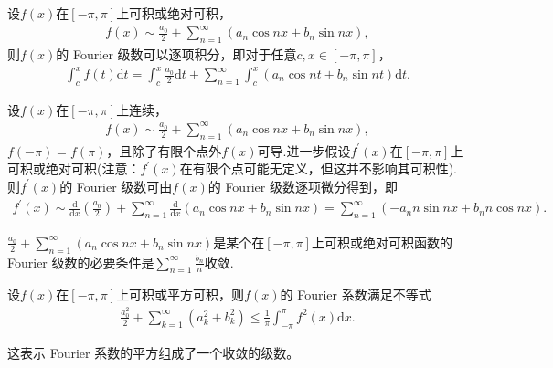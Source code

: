 \documentclass[../../main.tex]{subfiles}
\begin{document}
\begin{theorem}[Fourier级数的逐项积分定理]\label{theorem:Fourier级数的逐项积分定理}
设$f(x)$在$[-\pi,\pi]$上可积或绝对可积，
\begin{align*}
f(x)\sim\frac{a_0}{2}+\sum_{n = 1}^{\infty}(a_n\cos nx + b_n\sin nx),
\end{align*}
则$f(x)$的 Fourier 级数可以逐项积分，即对于任意$c,x\in[-\pi,\pi]$，
\begin{align*}
\int_{c}^{x}f(t)\mathrm{d}t=\int_{c}^{x}\frac{a_0}{2}\mathrm{d}t+\sum_{n = 1}^{\infty}\int_{c}^{x}(a_n\cos nt + b_n\sin nt)\mathrm{d}t.
\end{align*}
\end{theorem}

\begin{theorem}[Fourier级数的逐项微分定理]\label{theorem:Fourier级数的逐项微分定理}
设$f(x)$在$[-\pi,\pi]$上连续，
\begin{align*}
f(x)\sim\frac{a_0}{2}+\sum_{n = 1}^{\infty}(a_n\cos nx + b_n\sin nx),
\end{align*}
$f(-\pi)=f(\pi)$，且除了有限个点外$f(x)$可导.进一步假设$f^{\prime}(x)$在$[-\pi,\pi]$上可积或绝对可积(注意：$f^{\prime}(x)$在有限个点可能无定义，但这并不影响其可积性). 则$f^{\prime}(x)$的 Fourier 级数可由$f(x)$的 Fourier 级数逐项微分得到，即
\begin{align*}
f^{\prime}(x)\sim\frac{\mathrm{d}}{\mathrm{d}x}\left(\frac{a_0}{2}\right)+\sum_{n = 1}^{\infty}\frac{\mathrm{d}}{\mathrm{d}x}(a_n\cos nx + b_n\sin nx)=\sum_{n = 1}^{\infty}(-a_nn\sin nx + b_nn\cos nx).
\end{align*}
\end{theorem}

\begin{corollary}
$\frac{a_0}{2}+\sum_{n = 1}^{\infty}(a_n\cos nx + b_n\sin nx)$是某个在$[-\pi,\pi]$上可积或绝对可积函数的 Fourier 级数的必要条件是$\sum_{n = 1}^{\infty}\frac{b_n}{n}$收敛. 
\end{corollary}

\begin{theorem}[Bessel不等式]\label{theorem:Bessel不等式}
设$f(x)$在$[-\pi,\pi]$上可积或平方可积，则$f(x)$的 Fourier 系数满足不等式
\begin{align*}
\frac{a_0^2}{2}+\sum_{k = 1}^{\infty}(a_k^2 + b_k^2)\leqslant \frac{1}{\pi}\int_{-\pi}^{\pi}f^2(x)\mathrm{d}x.
\end{align*}
\end{theorem}
\begin{note}
这表示 Fourier 系数的平方组成了一个收敛的级数。
\end{note}
\end{document}
